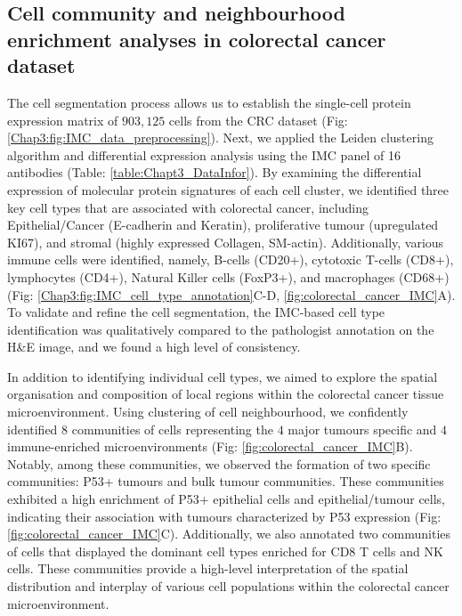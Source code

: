 \subsection{Cell community and neighbourhood enrichment analyses in colorectal cancer dataset}
The cell segmentation process allows us to establish the single-cell protein expression matrix of $903,125$ cells from the CRC dataset (Fig: \ref{Chap3:fig:IMC_data_preprocessing}). Next, we applied the Leiden clustering algorithm and differential expression analysis using the IMC panel of 16 antibodies (Table: \ref{table:Chapt3_DataInfor}). By examining the differential expression of molecular protein signatures of each cell cluster, we identified three key cell types that are associated with colorectal cancer, including Epithelial/Cancer (E-cadherin and Keratin), proliferative tumour (upregulated KI67), and stromal (highly expressed Collagen, SM-actin). Additionally, various immune cells were identified, namely, B-cells (CD20+), cytotoxic T-cells (CD8+), lymphocytes (CD4+), Natural Killer cells (FoxP3+), and macrophages (CD68+) (Fig: \ref{Chap3:fig:IMC_cell_type_annotation}C-D, \ref{fig:colorectal_cancer_IMC}A). To validate and refine the cell segmentation, the IMC-based cell type identification was qualitatively compared to the pathologist annotation on the H\&E image, and we found a high level of consistency.  

In addition to identifying individual cell types, we aimed to explore the spatial organisation and composition of local regions within the colorectal cancer tissue microenvironment. Using clustering of cell neighbourhood, we confidently identified $8$ communities of cells representing the $4$ major tumours specific and $4$ immune-enriched microenvironments (Fig: \ref{fig:colorectal_cancer_IMC}B). Notably, among these communities, we observed the formation of two specific communities: P53+ tumours and bulk tumour communities. These communities exhibited a high enrichment of P53+ epithelial cells and epithelial/tumour cells, indicating their association with tumours characterized by P53 expression (Fig: \ref{fig:colorectal_cancer_IMC}C). Additionally, we also annotated two communities of cells that displayed the dominant cell types enriched for CD8 T cells and NK cells. These communities provide a high-level interpretation of the spatial distribution and interplay of various cell populations within the colorectal cancer microenvironment.     

